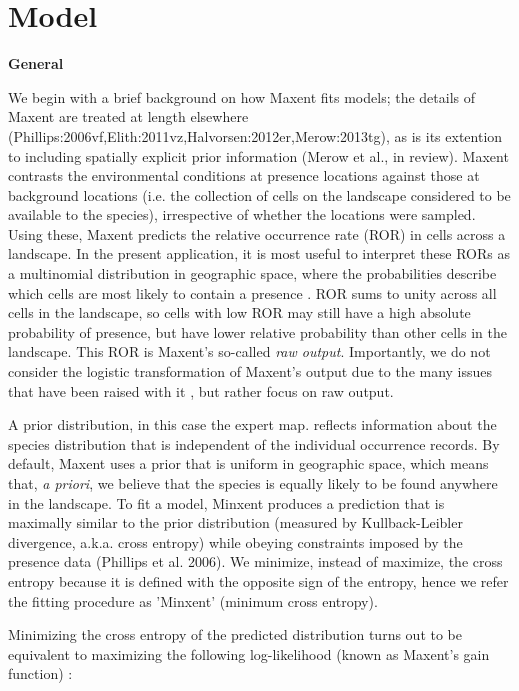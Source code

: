 \section{Model}
\label{sec:Model} 

\textbf{General} 

We begin with a brief background on how Maxent fits models; the details of Maxent are treated at length elsewhere (Phillips:2006vf,Elith:2011vz,Halvorsen:2012er,Merow:2013tg), as is its extention to including spatially explicit prior information (Merow et al., in review). 
Maxent contrasts the environmental conditions at presence locations against those at background locations (i.e. the collection of cells on the landscape considered to be available to the species), irrespective of whether the locations were sampled. Using these, Maxent predicts the relative occurrence rate (ROR) in cells across a landscape. In the present application, it is most useful to interpret these RORs as a multinomial distribution in geographic space, where the probabilities describe which cells are most likely to contain a presence \citep{Merow:2013tg}. ROR sums to unity across all cells in the landscape, so cells with low ROR may still have a high absolute probability of presence, but have lower relative probability than other cells in the landscape. This ROR is Maxent's so-called \emph{raw output}. Importantly, we do not consider the logistic transformation of Maxent's output \citep[cf. ][]{Phillips:2008uk} due to the many issues that have been raised with it \citep{Royle:2012vt,Merow:2013tg}, but rather focus on raw output.


A prior distribution, in this case the expert map. reflects information about the species distribution that is independent of the individual occurrence records. By default, Maxent uses a prior that is uniform in geographic space, which means that,  \emph{a priori}, we believe that the species is equally likely to be found anywhere in the landscape. To fit a model, Minxent produces a prediction that is maximally similar to the prior distribution (measured by Kullback-Leibler divergence, a.k.a. cross entropy) while obeying constraints imposed by the presence data (Phillips et al. 2006). We minimize, instead of maximize, the cross entropy because it is defined with the opposite sign of the entropy, hence we refer the fitting procedure as 'Minxent' (minimum cross entropy).


Minimizing the cross entropy of the predicted distribution turns out to be equivalent to maximizing the following log-likelihood (known as Maxent's gain function) \cite{Dudik:2004tc, Phillips:2006vf, Merow:2013tg}:


